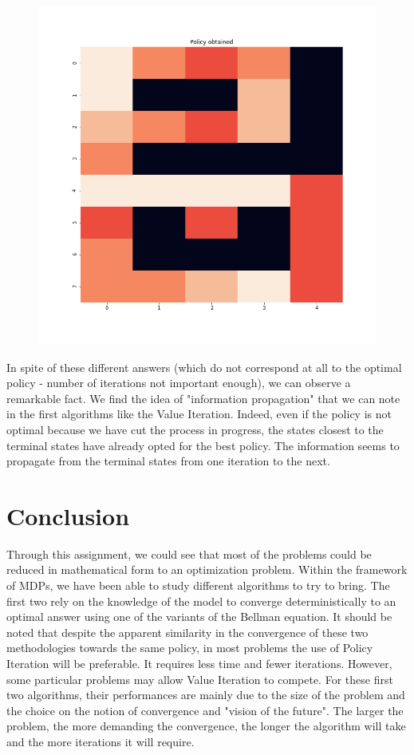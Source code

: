 \documentclass[11pt]{article}
\begin{document}
\begin{multicols}{2}
\begin{figure}[H]
\centering
\includegraphics[scale = 0.3]{Policy_ql_eps2.png}
\end{figure}

In spite of these different answers (which do not correspond at all to the optimal policy - number of iterations not important enough), we can observe a remarkable fact. We find the idea of "information propagation" that we can note in the first algorithms like the Value Iteration. Indeed, even if the policy is not optimal because we have cut the process in progress, the states closest to the terminal states have already opted for the best policy. The information seems to propagate from the terminal states from one iteration to the next.

\section{Conclusion}

Through this assignment, we could see that most of the problems could be reduced in mathematical form to an optimization problem. Within the framework of MDPs, we have been able to study different algorithms to try to bring. The first two rely on the knowledge of the model to converge deterministically to an optimal answer using one of the variants of the Bellman equation. It should be noted that despite the apparent similarity in the convergence of these two methodologies towards the same policy, in most problems the use of Policy Iteration will be preferable. It requires less time and fewer iterations. However, some particular problems may allow Value Iteration to compete. For these first two algorithms, their performances are mainly due to the size of the problem and the choice on the notion of convergence and "vision of the future". The larger the problem, the more demanding the convergence, the longer the algorithm will take and the more iterations it will require.


\end{multicols}
\end{document}
